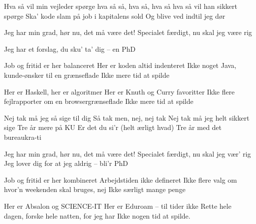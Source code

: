 \documentclass[a4paper,11pt]{article}
\begin{document}
\begin{song}

  Hva så vil min vejleder spørge
  hva så så, hva så, hva så
  hva så vil han sikkert spørge
  Ska' kode slam på job
  i kapitalens sold
  Og blive ved indtil jeg dør


  Jeg har min grad, hør nu, det må være det!
  Specialet færdigt, nu skal jeg være rig


  Jeg har et forslag, du sku' ta' dig -- en PhD


  Job og fritid er her balanceret
  Her er koden altid indenteret
  Ikke noget Java, kunde-ønsker til en grænseflade
  Ikke mere tid at spilde


  Her er Haskell, her er algoritmer
  Her er Knuth og Curry favoritter
  Ikke flere fejlrapporter om en browsergrænseflade
  Ikke mere tid at spilde


  Nej tak må jeg så sige til dig
  Så tak men, nej, nej tak
  Nej tak må jeg helt sikkert sige
  Tre år mere på KU
  Er det du si'r (helt ærligt hvad)
  Tre år med det bureaukra-ti
  

  Jeg har min grad, hør nu, det må være det!
  Specialet færdigt, nu skal jeg vær' rig
  Jeg lover dig for at jeg aldrig -- bli'r PhD

  Job og fritid er her kombineret
  Arbejdstiden ikke defineret
  Ikke flere valg om hvor'n weekenden skal bruges, nej
  Ikke særligt mange penge


  Her er Absalon og SCIENCE-IT
  Her er Eduroam -- til tider ikke
  Rette hele dagen, forske hele natten, for jeg har
  Ikke nogen tid at spilde.


\end{song}
\end{document}

